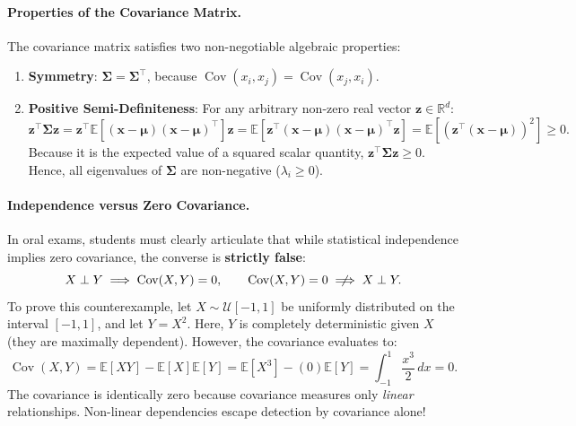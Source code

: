 \paragraph{Properties of the Covariance Matrix.}
The covariance matrix satisfies two non-negotiable algebraic properties:
\begin{enumerate}[noitemsep]
  \item \textbf{Symmetry}: $\boldsymbol{\Sigma} = \boldsymbol{\Sigma}^\top$, because $\operatorname{Cov}(x_i, x_j) = \operatorname{Cov}(x_j, x_i)$.
  \item \textbf{Positive Semi-Definiteness}: For any arbitrary non-zero real vector $\mathbf{z} \in \mathbb{R}^d$:
  \begin{equation}
  \mathbf{z}^\top \boldsymbol{\Sigma} \mathbf{z} = \mathbf{z}^\top \mathbb{E}\left[ (\mathbf{x} - \boldsymbol{\mu})(\mathbf{x} - \boldsymbol{\mu})^\top \right] \mathbf{z} = \mathbb{E}\left[ \mathbf{z}^\top (\mathbf{x} - \boldsymbol{\mu}) (\mathbf{x} - \boldsymbol{\mu})^\top \mathbf{z} \right] = \mathbb{E}\left[ (\mathbf{z}^\top (\mathbf{x} - \boldsymbol{\mu}))^2 \right] \ge 0.
  \label{eq:psd_covariance_proof}
  \end{equation}
  Because it is the expected value of a squared scalar quantity, $\mathbf{z}^\top \boldsymbol{\Sigma} \mathbf{z} \ge 0$. Hence, all eigenvalues of $\boldsymbol{\Sigma}$ are non-negative ($\lambda_i \ge 0$).
\end{enumerate}

\paragraph{Independence versus Zero Covariance.}
In oral exams, students must clearly articulate that while statistical independence implies zero covariance, the converse is \textbf{strictly false}:
\begin{equation}
X \perp Y \implies \operatorname{Cov}(X, Y) = 0, \qquad \operatorname{Cov}(X, Y) = 0 \centernot\implies X \perp Y.
\end{equation}
To prove this counterexample, let $X \sim \mathcal{U}[-1, 1]$ be uniformly distributed on the interval $[-1, 1]$, and let $Y = X^2$. Here, $Y$ is completely deterministic given $X$ (they are maximally dependent). However, the covariance evaluates to:
\begin{equation}
\operatorname{Cov}(X, Y) = \mathbb{E}[X Y] - \mathbb{E}[X]\mathbb{E}[Y] = \mathbb{E}[X^3] - (0)\mathbb{E}[Y] = \int_{-1}^1 \frac{x^3}{2} \, dx = 0.
\end{equation}
The covariance is identically zero because covariance measures only \emph{linear} relationships. Non-linear dependencies escape detection by covariance alone!

